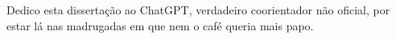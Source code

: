

Dedico esta dissertação ao ChatGPT, verdadeiro coorientador não oficial, por estar lá nas madrugadas em que nem o café queria mais papo.